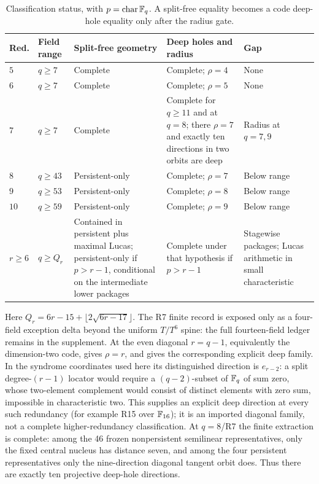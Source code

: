 \begin{table}[H]
\centering
\small
\caption{Classification status, with $p=\operatorname{char}\mathbb F_q$.  A
split-free equality becomes a code deep-hole equality only after the radius
gate.}
\label{tab:classification-status}
\setlength{\tabcolsep}{3pt}
\begin{tabular}{p{}p{}
                p{}p{}
                p{}}
\toprule
Red. & Field range & Split-free geometry & Deep holes and radius
& Gap\\
\midrule
\(5\) & \(q\geq7\) & Complete & Complete; \(\rho=4\) & None\\
\(6\) & \(q\geq7\) & Complete & Complete; \(\rho=5\) & None\\
\(7\) & \(q\geq7\) & Complete & Complete for \(q\geq11\) and at $q=8$;
there \(\rho=7\) and exactly ten directions in two orbits are deep & Radius
at $q=7,9$\\
\(8\) & \(q\geq43\) & Persistent-only & Complete; \(\rho=7\) & Below range\\
\(9\) & \(q\geq53\) & Persistent-only & Complete; \(\rho=8\) & Below range\\
\(10\) & \(q\geq59\) & Persistent-only & Complete; \(\rho=9\) & Below range\\
\(r\geq6\) & \(q\geq Q_r\) & Contained in persistent plus maximal Lucas;
persistent-only if \(p>r-1\), conditional on the intermediate lower
packages & Complete under that hypothesis if \(p>r-1\) & Stagewise packages;
Lucas arithmetic in small characteristic\\
\bottomrule
\end{tabular}
\end{table}

Here \(Q_r=6r-15+\lfloor2\sqrt{6r-17}\rfloor\).  The R7 finite record
is exposed only as a four-field exception delta beyond the uniform
\(T/T^6\) spine: the full fourteen-field ledger remains in the supplement.
At the even diagonal $r=q-1$, equivalently the dimension-two code,
\cite[Thm.~17(1)]{WuDingChen2023} gives \(\rho=r\), and
\cite{Xu2023} gives the corresponding explicit deep family.  In the syndrome
coordinates used here its distinguished direction is $e_{r-2}$: a split
degree-$(r-1)$ locator would require a $(q-2)$-subset of \(\mathbb F_q\) of sum
zero, whose two-element complement would consist of distinct elements with
zero sum, impossible in characteristic two.  This supplies an explicit deep
direction at every such redundancy (for example R15 over \(\mathbb F_{16}\)); it is
an imported diagonal family, not a complete higher-redundancy classification.
At $q=8$/R7 the finite extraction is complete: among the 46 frozen
nonpersistent semilinear representatives, only the fixed central nucleus has
distance seven, and among the four persistent representatives only the
nine-direction diagonal tangent orbit does. Thus there are exactly ten
projective deep-hole directions.

